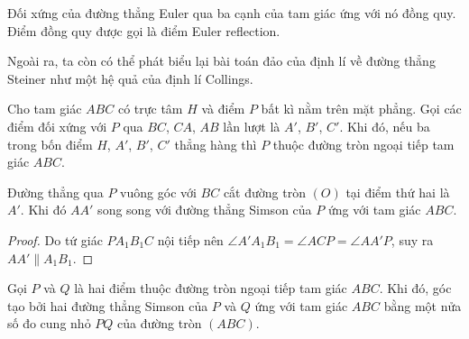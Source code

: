         \begin{corollary}
            Đối xứng của đường thẳng Euler qua ba cạnh của tam giác ứng với nó đồng quy. Điểm đồng quy được gọi là điểm Euler reflection.
        \end{corollary}

        Ngoài ra, ta còn có thể phát biểu lại bài toán đảo của định lí về đường thẳng Steiner như một hệ quả của định lí Collings.

        \begin{corollary}
            Cho tam giác \(ABC\) có trực tâm \(H\) và điểm \(P\) bất kì nằm trên mặt phẳng. Gọi các điểm đối xứng với \(P\) qua \(BC\), \(CA\), \(AB\) lần lượt là \(A'\), \(B'\), \(C'\). Khi đó, nếu ba trong bốn điểm \(H\), \(A'\), \(B'\), \(C'\) thẳng hàng thì \(P\) thuộc đường tròn ngoại tiếp tam giác \(ABC\).
        \end{corollary}

        \begin{property}
            Đường thẳng qua \(P\) vuông góc với \(BC\) cắt đường tròn \((O)\) tại điểm thứ hai là \(A'\). Khi đó \(AA'\) song song với đường thẳng Simson của \(P\) ứng với tam giác \(ABC\).
        \end{property}

        \begin{proof}
            Do tứ giác \(PA_1B_1C\) nội tiếp nên \(\angle A'A_1B_1 = \angle ACP = \angle AA'P\), suy ra \(AA' \parallel A_1B_1\).
        \end{proof}

        \begin{property}
            Gọi \(P\) và \(Q\) là hai điểm thuộc đường tròn ngoại tiếp tam giác \(ABC\). Khi đó, góc tạo bởi hai đường thẳng Simson của \(P\) và \(Q\) ứng với tam giác \(ABC\) bằng một nửa số đo cung nhỏ \(PQ\) của đường tròn \((ABC)\).
        \end{property}

